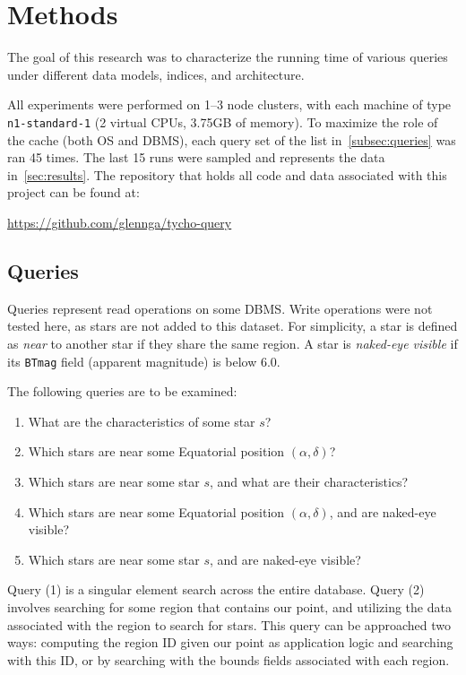 \section{Methods}\label{sec:methods}
The goal of this research was to characterize the running time of various queries under different data models, indices,
and architecture.

All experiments were performed on 1--3 node clusters, with each machine of type \texttt{n1-standard-1} (2 virtual CPUs,
3.75GB of memory).
To maximize the role of the cache (both OS and DBMS), each query set of the list in~\autoref{subsec:queries} was ran
45 times.
The last 15 runs were sampled and represents the data in~\autoref{sec:results}.
The repository that holds all code and data associated with this project can be found at:

\url{https://github.com/glennga/tycho-query}

\subsection{Queries}\label{subsec:queries}
Queries represent read operations on some DBMS\@.
Write operations were not tested here, as stars are not added to this dataset.
For simplicity, a star is defined as \textit{near} to another star if they share the same region.
A star is \textit{naked-eye visible} if its \texttt{BTmag} field (apparent magnitude) is below 6.0.

The following queries are to be examined:
\begin{enumerate}
    \item What are the characteristics of some star $s$?
    \item Which stars are near some Equatorial position $(\alpha, \delta)$?
    \item Which stars are near some star $s$, and what are their characteristics?
    \item Which stars are near some Equatorial position $(\alpha, \delta)$, and are naked-eye visible?
    \item Which stars are near some star $s$, and are naked-eye visible?
\end{enumerate}

Query (1) is a singular element search across the entire database.
Query (2) involves searching for some region that contains our point, and utilizing the data associated with the
region to search for stars.
This query can be approached two ways: computing the region ID given our point as application logic and searching with
this ID, or by searching with the bounds fields associated with each region.

